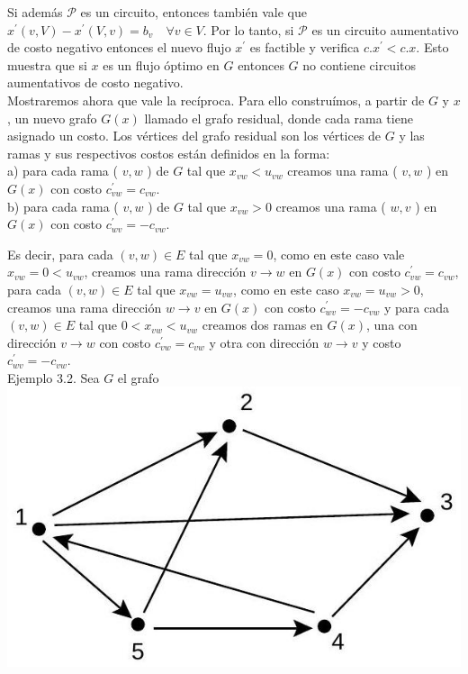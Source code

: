 \documentclass[10pt]{article}
\begin{document}
Si además $\mathcal{P}$ es un circuito, entonces también vale que $x^{\prime}(v, V)-x^{\prime}(V, v)=b_{v} \quad \forall v \in V$. Por lo tanto, si $\mathcal{P}$ es un circuito aumentativo de costo negativo entonces el nuevo flujo $x^{\prime}$ es factible y verifica $c . x^{\prime}<c . x$. Esto muestra que si $x$ es un flujo óptimo en $G$ entonces $G$ no contiene circuitos aumentativos de costo negativo.\\
Mostraremos ahora que vale la recíproca. Para ello construímos, a partir de $G$ y $x$, un nuevo grafo $G(x)$ llamado el grafo residual, donde cada rama tiene asignado un costo. Los vértices del grafo residual son los vértices de $G$ y las ramas y sus respectivos costos están definidos en la forma:\\
a) para cada rama ( $v, w$ ) de $G$ tal que $x_{v w}<u_{v w}$ creamos una rama ( $v, w$ ) en $G(x)$ con costo $c_{v w}^{\prime}=c_{v w}$.\\
b) para cada rama ( $v, w$ ) de $G$ tal que $x_{v w}>0$ creamos una rama ( $w, v$ ) en $G(x)$ con costo $c_{w v}^{\prime}=-c_{v w}$.

Es decir, para cada $(v, w) \in E$ tal que $x_{v w}=0$, como en este caso vale $x_{v w}=0<u_{v w}$, creamos una rama dirección $v \longrightarrow w$ en $G(x)$ con costo $c_{v w}^{\prime}=c_{v w}$, para cada $(v, w) \in E$ tal que $x_{v w}=u_{v w}$, como en este caso $x_{v w}=u_{v w}>0$, creamos una rama dirección $w \longrightarrow v$ en $G(x)$ con costo $c_{w v}^{\prime}=-c_{v w}$ y para cada $(v, w) \in E$ tal que $0<x_{v w}<u_{v w}$ creamos dos ramas en $G(x)$, una con dirección $v \longrightarrow w$ con costo $c_{v w}^{\prime}=c_{v w}$ y otra con dirección $w \longrightarrow v$ y costo $c_{w v}^{\prime}=-c_{v w}$.\\
Ejemplo 3.2. Sea $G$ el grafo\\
\includegraphics[max width=\textwidth, center]{2025_09_05_955b52bfc43174a24a9ag-12}
\end{document}
